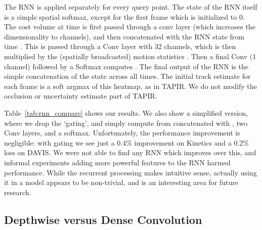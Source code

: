 \documentclass[10pt,twocolumn,letterpaper]{article}
\begin{document}
The RNN is applied separately for every query point.  The state  of the RNN itself is a simple spatial softmax, except for the first frame which is initialized to 0.  The cost volume  at time  is first passed through a conv layer (which increases the dimensionality to  channels), and then concatenated with the RNN state  from time .   This is passed through a Conv layer with 32 channels, which is then multiplied by the (spatially broadcasted) motion statistics .  Then a final Conv (1 channel) followed by a Softmax computes .  The final output of the RNN is the simple concatenation of the state  across all times. The initial track estimate for each frame is a soft argmax of this heatmap, as in TAPIR.  We do not modify the occlusion or uncertainty estimate part of TAPIR.

Table~\ref{tab:rnn_compare} shows our results.  We also show a simplified version, where we drop the `gating', and simply compute  from  concatenated with , two Conv layers, and a softmax.  Unfortunately, the performance improvement is negligible: with gating we see just a 0.4\% improvement on Kinetics and a 0.2\% loss on DAVIS.  We were not able to find any RNN which improves over this, and informal experiments adding more powerful features to the RNN harmed performance.  While the recurrent processing makes intuitive sense, actually using it in a model appears to be non-trivial, and is an interesting area for future research.


\begin{table}[t]
\caption{\textbf{Comparison between the layer kernel type in iterative updates.} We find that depthwise conv works slightly better than a dense 1D convolution, even though the latter has more parameters.}
\label{tab:conv_kernel_compare}
\end{table}

\subsection{Depthwise versus Dense Convolution}
\end{document}
